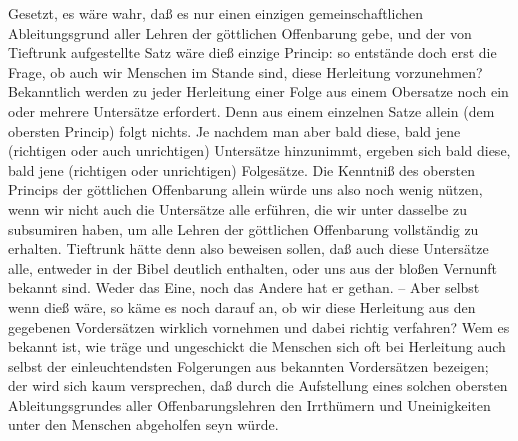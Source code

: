 \begin{aufza}
\item[\RWbet{Widerlegung.}] Gesetzt, es wäre wahr, daß es nur einen einzigen gemeinschaftlichen Ableitungsgrund aller Lehren der göttlichen Offenbarung gebe, und der von Tieftrunk aufgestellte Satz wäre dieß einzige Princip: so entstände doch erst die Frage, ob auch wir Menschen im Stande sind, diese Herleitung vorzunehmen? Bekanntlich werden zu jeder Herleitung einer Folge aus einem Obersatze noch ein oder mehrere Untersätze erfordert. Denn aus einem einzelnen Satze allein (dem obersten Princip) folgt nichts. Je nachdem man aber bald diese, bald jene (richtigen oder auch unrichtigen) Untersätze hinzunimmt, ergeben sich bald diese, bald jene (richtigen oder unrichtigen) Folgesätze. Die Kenntniß des obersten Princips der göttlichen Offenbarung allein würde uns also noch wenig nützen, wenn wir nicht auch die Untersätze alle erführen, die wir unter dasselbe zu subsumiren haben, um alle Lehren der göttlichen Offenbarung vollständig zu erhalten. Tieftrunk hätte denn also beweisen sollen, daß auch diese Untersätze alle, entweder in der Bibel deutlich enthalten, oder uns aus der bloßen Vernunft bekannt sind. Weder das Eine, noch das Andere hat er gethan. -- Aber selbst wenn dieß wäre, so käme es noch darauf an, ob wir diese Herleitung aus den gegebenen Vordersätzen wirklich vornehmen und dabei richtig verfahren? Wem es bekannt ist, wie träge und ungeschickt die Menschen sich oft bei Herleitung auch selbst der einleuchtendsten Folgerungen aus bekannten Vordersätzen bezeigen; der wird sich kaum versprechen, daß durch die Aufstellung eines solchen obersten Ableitungsgrundes aller Offenbarungslehren den Irrthümern und Uneinigkeiten unter den Menschen abgeholfen seyn würde.
\end{aufza}

